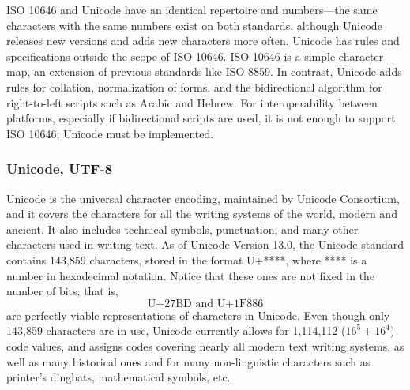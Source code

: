     ISO 10646 and Unicode have an identical repertoire and numbers—the same characters with the same numbers exist on both standards, although Unicode releases new versions and adds new characters more often. Unicode has rules and specifications outside the scope of ISO 10646. ISO 10646 is a simple character map, an extension of previous standards like ISO 8859. In contrast, Unicode adds rules for collation, normalization of forms, and the bidirectional algorithm for right-to-left scripts such as Arabic and Hebrew. For interoperability between platforms, especially if bidirectional scripts are used, it is not enough to support ISO 10646; Unicode must be implemented.

  \subsubsection{Unicode, UTF-8}

    Unicode is the universal character encoding, maintained by Unicode Consortium, and it covers the characters for all the writing systems of the world, modern and ancient. It also includes technical symbols, punctuation, and many other characters used in writing text. As of Unicode Version 13.0, the Unicode standard contains 143,859 characters, stored in the format U+****, where **** is a number in hexadecimal notation. Notice that these ones are not fixed in the number of bits; that is, 
    \begin{equation}
      \text{U+27BD and U+1F886}
    \end{equation}
    are perfectly viable representations of characters in Unicode. Even though only 143,859 characters are in use, Unicode currently allows for 1,114,112 ($16^5 + 16^4$) code values, and assigns codes covering nearly all modern text writing systems, as well as many historical ones and for many non-linguistic characters such as printer's dingbats, mathematical symbols, etc.

